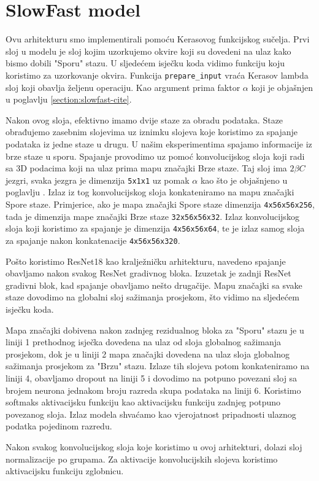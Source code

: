 \documentclass[times, utf8, diplomski,  numeric]{fer}
\begin{document}
\section{SlowFast model}
Ovu arhitekturu smo implementirali pomoću Kerasovog funkcijskog sučelja. Prvi sloj u modelu je sloj kojim uzorkujemo okvire koji su dovedeni na ulaz kako bismo dobili "Sporu" stazu. U sljedećem isječku koda vidimo funkciju koju koristimo za uzorkovanje okvira. Funkcija \verb|prepare_input| vraća Kerasov lambda sloj koji obavlja željenu operaciju. Kao argument prima faktor $\alpha$ koji je objašnjen u poglavlju \ref{section:slowfast-cite}.

Nakon ovog sloja, efektivno imamo dvije staze za obradu podataka. Staze obrađujemo zasebnim slojevima uz iznimku slojeva koje koristimo za spajanje podataka iz jedne staze u drugu. U našim eksperimentima spajamo informacije iz brze staze u sporu. Spajanje provodimo uz pomoć konvolucijskog sloja koji radi sa 3D podacima koji na ulaz prima mapu značajki Brze staze. Taj sloj ima $2 \beta C$ jezgri, svaka jezgra je dimenzija \verb|5x1x1| uz pomak $\alpha$ kao što je objašnjeno u poglavlju \cite{section:slowfast-cite}. Izlaz iz tog konvolucijskog sloja konkateniramo na mapu značajki Spore staze. Primjerice, ako je mapa značajki Spore staze dimenzija \verb|4x56x56x256|, tada je dimenzija mape značajki Brze staze \verb|32x56x56x32|. Izlaz konvolucijskog sloja koji koristimo za spajanje je dimenzija \verb|4x56x56x64|, te je izlaz samog sloja za spajanje nakon konkatenacije  \verb|4x56x56x320|.
\par
Pošto koristimo ResNet18 kao kralježničku arhitekturu, navedeno spajanje obavljamo nakon svakog ResNet gradivnog bloka. Izuzetak je zadnji ResNet gradivni blok, kad spajanje obavljamo nešto drugačije. Mapu značajki sa svake staze dovodimo na globalni sloj sažimanja prosjekom, što vidimo na sljedećem isječku koda. 

Mapa značajki dobivena nakon zadnjeg rezidualnog bloka za "Sporu" stazu je u liniji 1 prethodnog isječka dovedena na ulaz od sloja globalnog sažimanja prosjekom, dok je u liniji 2 mapa značajki dovedena na ulaz sloja globalnog sažimanja prosjekom za "Brzu" stazu.  
Izlaze tih slojeva potom konkateniramo na liniji 4, obavljamo dropout na liniji 5 i dovodimo na potpuno povezani sloj sa brojem neurona jednakom broju razreda skupa podataka na liniji 6. Koristimo softmaks aktivacijsku funkciju kao aktivacijsku funkciju zadnjeg potpuno povezanog sloja. Izlaz modela shvaćamo kao vjerojatnost pripadnosti ulaznog podatka pojedinom razredu.
\par
Nakon svakog konvolucijskog sloja koje koristimo u ovoj arhitekturi, dolazi sloj normalizacije po grupama. Za aktivacije konvolucijskih slojeva koristimo aktivacijsku funkciju zglobnicu. 
\end{document}
